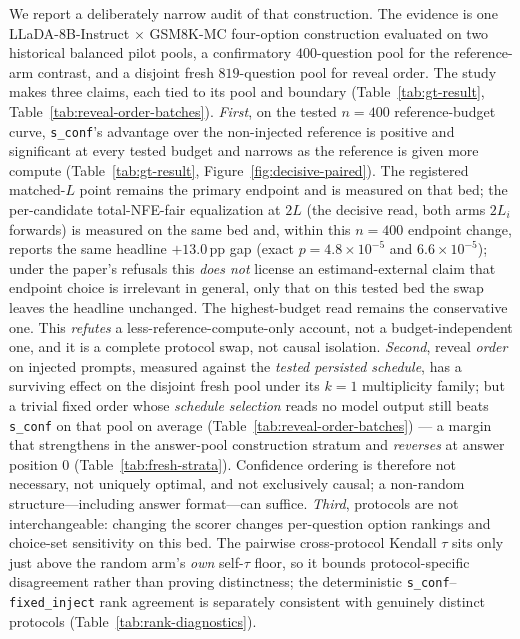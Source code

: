 \documentclass{article}
\newcommand{\sconf}{\texttt{s\_conf}}
\newcommand{\finj}{\texttt{fixed\_inject}}
\newcommand{\pp}{\,\mathrm{pp}}
\begin{document}
We report a deliberately narrow audit of that construction.  The evidence is
one LLaDA-8B-Instruct $\times$ GSM8K-MC four-option construction evaluated on
two historical balanced pilot pools, a confirmatory $400$-question pool for
the reference-arm contrast, and a disjoint fresh $819$-question pool for
reveal order.  The study makes three claims, each tied to its pool and
boundary (Table~\ref{tab:gt-result}, Table~\ref{tab:reveal-order-batches}).
\emph{First}, on the tested $n{=}400$ reference-budget curve, \sconf{}'s
advantage over the non-injected reference is positive and significant at every
tested budget and narrows as the reference is given more compute
(Table~\ref{tab:gt-result}, Figure~\ref{fig:decisive-paired}).  The registered
matched-$L$ point remains the primary endpoint and is measured on that bed; the
per-candidate total-NFE-fair equalization at $2L$ (the decisive read, both arms
$2L_i$ forwards) is measured on the same bed and, within this
$n{=}400$ endpoint change, reports the same headline $+13.0\pp$ gap (exact
$p=4.8\!\times\!10^{-5}$ and $6.6\!\times\!10^{-5}$); under the paper's
refusals this \emph{does not} license an estimand-external claim that endpoint
choice is irrelevant in general, only that on this tested bed the swap leaves
the headline unchanged.  The highest-budget read remains the conservative
one.  This \emph{refutes} a less-reference-compute-only account,
not a budget-independent one, and it is a complete protocol swap, not causal
isolation.  \emph{Second}, reveal \emph{order} on
injected prompts, measured against the \emph{tested persisted schedule}, has a
surviving effect on the disjoint fresh pool under its $k{=}1$ multiplicity
family; but a trivial fixed order whose \emph{schedule selection} reads no model
output still beats \sconf{} on that pool on average
(Table~\ref{tab:reveal-order-batches}) --- a margin that strengthens in the
answer-pool construction stratum and \emph{reverses} at answer position 0
(Table~\ref{tab:fresh-strata}).  Confidence ordering is therefore not
necessary, not uniquely optimal, and not exclusively causal; a non-random
structure---including answer format---can suffice.  \emph{Third}, protocols
are not interchangeable: changing the scorer changes per-question option
rankings and choice-set sensitivity on this bed.  The pairwise cross-protocol
Kendall $\tau$ sits only just above the random arm's \emph{own} self-$\tau$
floor, so it bounds protocol-specific disagreement rather than proving
distinctness; the deterministic \sconf{}--\finj{} rank agreement is separately
consistent with genuinely distinct protocols
(Table~\ref{tab:rank-diagnostics}).
\end{document}
